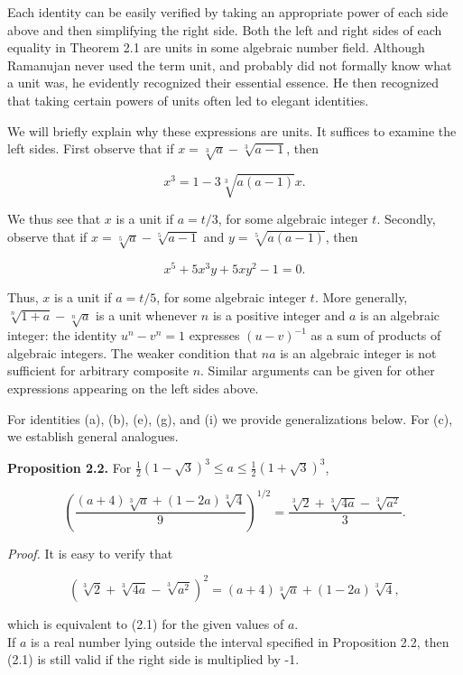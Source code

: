 \documentclass[11pt,letterpaper]{article}
\begin{document}
Each identity can be easily verified by taking an appropriate power of each side above and then simplifying the right side. Both the left and right sides of each equality in Theorem 2.1 are units in some algebraic number field. Although Ramanujan never used the term unit, and probably did not formally know what a unit was, he evidently recognized their essential essence. He then recognized that taking certain powers of units often led to elegant identities.

We will briefly explain why these expressions are units. It suffices to examine the left sides. First observe that if $x=\sqrt[3]{a}-\sqrt[3]{a-1}$, then

\[
x^{3}=1-3 \sqrt[3]{a(a-1)} x .
\]

We thus see that $x$ is a unit if $a=t / 3$, for some algebraic integer $t$. Secondly, observe that if $x=\sqrt[5]{a}-\sqrt[5]{a-1}$ and $y=\sqrt[5]{a(a-1)}$, then

\[
x^{5}+5 x^{3} y+5 x y^{2}-1=0 .
\]

Thus, $x$ is a unit if $a=t / 5$, for some algebraic integer $t$. More generally, $\sqrt[n]{1+a}-\sqrt[n]{a}$ is a unit whenever $n$ is a positive integer and $a$ is an algebraic integer: the identity $u^n-v^n=1$ expresses $(u-v)^{-1}$ as a sum of products of algebraic integers. The weaker condition that $na$ is an algebraic integer is not sufficient for arbitrary composite $n$. Similar arguments can be given for other expressions appearing on the left sides above.

For identities (a), (b), (e), (g), and (i) we provide generalizations below. For (c), we establish general analogues.

\noindent\textbf{Proposition 2.2.} For $\frac{1}{2}(1-\sqrt{3})^{3} \leq a \leq \frac{1}{2}(1+\sqrt{3})^{3}$,


\begin{equation*}
\left(\frac{(a+4) \sqrt[3]{a}+(1-2 a) \sqrt[3]{4}}{9}\right)^{1 / 2}=\frac{\sqrt[3]{2}+\sqrt[3]{4 a}-\sqrt[3]{a^{2}}}{3} . \tag{2.1}\label{eq:2.1}
\end{equation*}


\noindent\textit{Proof.} It is easy to verify that

\[
\left(\sqrt[3]{2}+\sqrt[3]{4 a}-\sqrt[3]{a^{2}}\right)^{2}=(a+4) \sqrt[3]{a}+(1-2 a) \sqrt[3]{4},
\]

which is equivalent to (2.1) for the given values of $a$.\\
If $a$ is a real number lying outside the interval specified in Proposition 2.2, then (2.1) is still valid if the right side is multiplied by -1.
\end{document}
